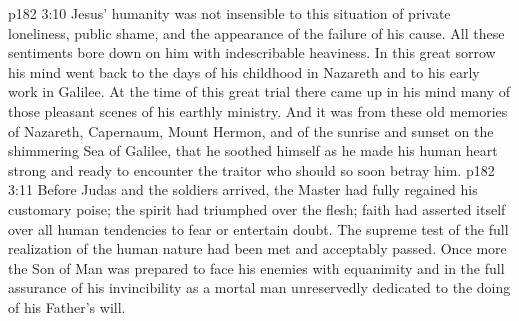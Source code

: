 \vs p182 3:10 Jesus’ humanity was not insensible to this situation of private loneliness, public shame, and the appearance of the failure of his cause. All these sentiments bore down on him with indescribable heaviness. In this great sorrow his mind went back to the days of his childhood in Nazareth and to his early work in Galilee. At the time of this great trial there came up in his mind many of those pleasant scenes of his earthly ministry. And it was from these old memories of Nazareth, Capernaum, Mount Hermon, and of the sunrise and sunset on the shimmering Sea of Galilee, that he soothed himself as he made his human heart strong and ready to encounter the traitor who should so soon betray him.
\vs p182 3:11 Before Judas and the soldiers arrived, the Master had fully regained his customary poise; the spirit had triumphed over the flesh; faith had asserted itself over all human tendencies to fear or entertain doubt. The supreme test of the full realization of the human nature had been met and acceptably passed. Once more the Son of Man was prepared to face his enemies with equanimity and in the full assurance of his invincibility as a mortal man unreservedly dedicated to the doing of his Father’s will.
\quizlink
